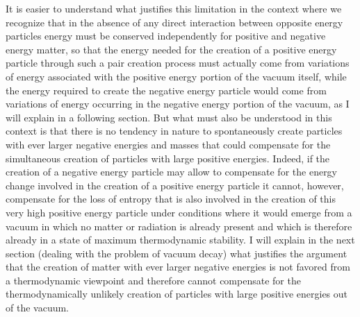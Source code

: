 \documentclass[notitlepage,12pt]{report}
\begin{document}
It is easier to understand what justifies this limitation in the context where we recognize that in the absence of any direct interaction between opposite energy particles energy must be conserved independently for positive and negative energy matter, so that the energy needed for the creation of a positive energy particle through such a pair creation process must actually come from variations of energy associated with the positive energy portion of the vacuum itself, while the energy required to create the negative energy particle would come from variations of energy occurring in the negative energy portion of the vacuum, as I will explain in a following section. But what must also be understood in this context is that there is no tendency in nature to spontaneously create particles with ever larger negative energies and masses that could compensate for the simultaneous creation of particles with large positive energies. Indeed, if the creation of a negative energy particle may allow to compensate for the energy change involved in the creation of a positive energy particle it cannot, however, compensate for the loss of entropy that is also involved in the creation of this very high positive energy particle under conditions where it would emerge from a vacuum in which no matter or radiation is already present and which is therefore already in a state of maximum thermodynamic stability. I will explain in the next section (dealing with the problem of vacuum decay) what justifies the argument that the creation of matter with ever larger negative energies is not favored from a thermodynamic viewpoint and therefore cannot compensate for the thermodynamically unlikely creation of particles with large positive energies out of the vacuum.
\end{document}
